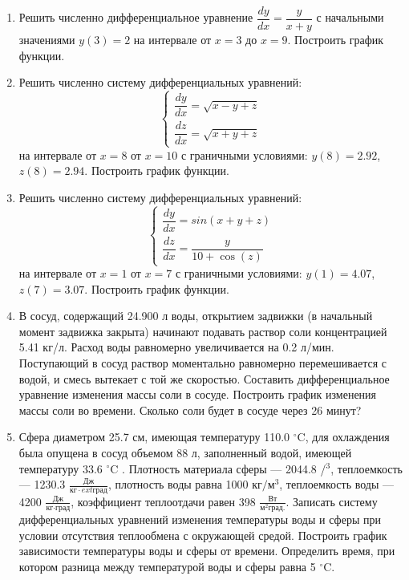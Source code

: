 \begin{enumerate}
\item Решить численно дифференциальное уравнение $\dfrac{dy}{dx}=\dfrac{y}{x+y}         $ с начальными значениями $y(     3)=     2$ на интервале от $x=     3$ до $x=     9$. Построить график функции.\item Решить численно систему дифференциальных уравнений:
 \begin{equation*}
\left\{
\begin{gathered}
\dfrac{dy}{dx}=\sqrt{x-y+z}          \\
\dfrac{dz}{dx}=\sqrt{x+y+z}          
\end{gathered}
\right.
\end{equation*}
на интервале от $x= 8$ от $x=10$ с граничными условиями: $y( 8)=2.92$, $z( 8)=2.94$. Построить график функции. 
\item Решить численно систему дифференциальных уравнений:
 \begin{equation*}
\left\{
\begin{gathered}
\dfrac{dy}{dx}=sin(x+y+z)\\
\dfrac{dz}{dx}=\dfrac{y}{10+\cos(z)}
\end{gathered}
\right.
\end{equation*}
на интервале от $x= 1$ от $x= 7$ с граничными условиями: $y( 1)=4.07$, $z( 7)=3.07$.  Построить график функции. 
\item  В сосуд, содержащий 24.900 л воды, открытием задвижки (в начальный момент задвижка закрыта) начинают подавать раствор соли концентрацией 5.41 кг/л. Расход воды равномерно увеличивается на 0.2 л/мин. Поступающий в сосуд раствор моментально равномерно перемешивается с водой, и смесь вытекает с той же скоростью. Составить дифференциальное уравнение изменения массы соли в сосуде. Построить график изменения массы соли во времени. Сколько соли будет в сосуде через  26 минут?

\item  Сфера диаметром 25.7 см, имеющая температуру 110.0 $^\circ\mathrm{C}$, для охлаждения была опущена в сосуд объемом   88 л, заполненный водой, имеющей температуру 33.6 $^\circ\mathrm{C}$ . Плотность материала сферы --- 2044.8 /$^\mathrm{3}$, теплоемкость --- 1230.3 $\frac{\text{Дж}}{\text{кг}\cdot 	ext{град}}$, плотность воды равна 1000 $\text{кг}/\text{м}^\mathrm{3}$, теплоемкость воды --- 4200 $\frac{\text{Дж}}{\text{кг}\cdot \text{град}}$, коэффициент теплоотдачи равен   398 $\frac{\text{Вт}}{\text{м}^2 \text{град.}}$. Записать систему дифференциальных уравнений изменения температуры воды и сферы при условии отсутствия теплообмена с окружающей средой. Построить график зависимости температуры воды и сферы от времени. Определить время, при котором разница между температурой воды и сферы равна 5 $^\circ\mathrm{C}$. 

\end{enumerate}
